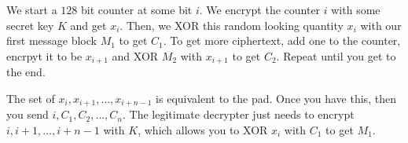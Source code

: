 \documentclass[psamsfonts]{amsart}
\begin{document}
We start a $128$ bit counter at some bit $i$. We encrypt the counter $i$ with some secret key $K$ and get $x_i$. Then, we XOR this random looking quantity $x_i$ with our first message block $M_1$ to get $C_1$. To get more ciphertext, add one to the counter, encrpyt it to be $x_{i+1}$ and XOR $M_2$ with $x_{i+1}$ to get $C_2$. Repeat until you get to the end.

The set of $x_{i}, x_{i+1}, \ldots, x_{i+n-1}$ is equivalent to the pad. Once you have this, then you send $i, C_1, C_2, \ldots, C_n$. The legitimate decrypter just needs to encrypt $i, i+1, \ldots, i+n-1$ with $K$, which allows you to XOR $x_{i}$ with $C_1$ to get $M_1$.
\end{document}
